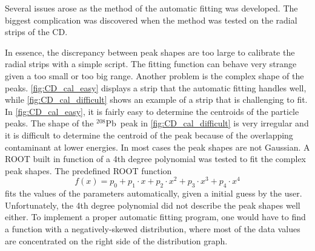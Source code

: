 \documentclass[twoside,english]{uiofysmaster/uiofysmaster}
\newcommand{\Pb}{$^{208}$Pb}
\let\orgautoref\autoref
\renewcommand{\autoref}
        {%
		 \def\sectionautorefname{Section}%
		 \def\subsectionautorefname{Section}%
		 \def\subsubsectionautorefname{Section}%
		 \def\chapterautorefname{Chapter}%
          \orgautoref}
\begin{document}
Several issues arose as the method of the automatic fitting was developed. 
The biggest complication was discovered when the method was tested on the radial strips of the CD.

In essence, the discrepancy between peak shapes are too large to calibrate the radial strips with a simple script.
The fitting function can behave very strange given a too small or too big range.
Another problem is the complex shape of the peaks. 
\autoref{fig:CD_cal_easy} displays a strip that the automatic fitting handles well, while \autoref{fig:CD_cal_difficult} shows an example of a strip that is challenging to fit.
In \autoref{fig:CD_cal_easy}, it is fairly easy to determine the centroids of the particle peaks.
The shape of the \Pb\ peak in \autoref{fig:CD_cal_difficult} is very irregular and it is difficult to determine the centroid of the peak because of the overlapping contaminant at lower energies.
In most cases the peak shapes are not Gaussian. 
A ROOT built in function of a 4th degree polynomial was tested to fit the complex peak shapes. 
The predefined ROOT function 
\begin{equation}
	f(x) = p_0 + p_1 \cdot x + p_2 \cdot x^2 + p_3 \cdot x^3 + p_4 \cdot x^4
\end{equation}
fits the values of the parameters automatically, given a initial guess by the user. 
Unfortunately, the 4th degree polynomial did not describe the peak shapes well either.
To implement a proper automatic fitting program, one would have to find a function with a negatively-skewed distribution, where most of the data values are concentrated on the right side of the distribution graph. 
\end{document}
